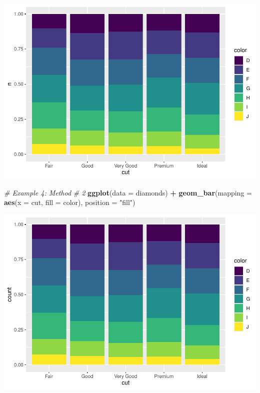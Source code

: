 \documentclass[
]{book}
\newenvironment{Shaded}{\begin{snugshade}}{\end{snugshade}}
\newcommand{\CommentTok}[1]{\textcolor[rgb]{0.56,0.35,0.01}{\textit{#1}}}
\newcommand{\DataTypeTok}[1]{\textcolor[rgb]{0.13,0.29,0.53}{#1}}
\newcommand{\KeywordTok}[1]{\textcolor[rgb]{0.13,0.29,0.53}{\textbf{#1}}}
\newcommand{\NormalTok}[1]{#1}
\newcommand{\OperatorTok}[1]{\textcolor[rgb]{0.81,0.36,0.00}{\textbf{#1}}}
\newcommand{\StringTok}[1]{\textcolor[rgb]{0.31,0.60,0.02}{#1}}
\begin{document}
\includegraphics{_main_files/figure-latex/unnamed-chunk-256-4.pdf}

\begin{Shaded}
\begin{Highlighting}[]
\CommentTok{# Example 4: Method}
\CommentTok{# 2}
\KeywordTok{ggplot}\NormalTok{(}\DataTypeTok{data =}\NormalTok{ diamonds) }\OperatorTok{+}
\StringTok{    }\KeywordTok{geom_bar}\NormalTok{(}\DataTypeTok{mapping =} \KeywordTok{aes}\NormalTok{(}\DataTypeTok{x =}\NormalTok{ cut,}
        \DataTypeTok{fill =}\NormalTok{ color),}
        \DataTypeTok{position =} \StringTok{"fill"}\NormalTok{)}
\end{Highlighting}
\end{Shaded}

\includegraphics{_main_files/figure-latex/unnamed-chunk-256-5.pdf}
\end{document}
